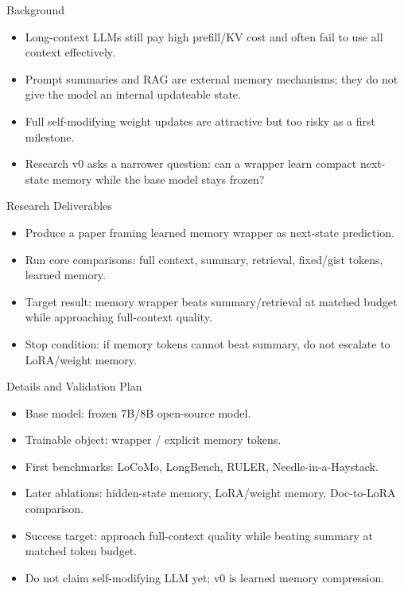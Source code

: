\begin{frame}{Background}
  \begin{itemize}
    \item Long-context LLMs still pay high prefill/KV cost and often fail to use all context effectively.
    \item Prompt summaries and RAG are external memory mechanisms; they do not give the model an internal updateable state.
    \item Full self-modifying weight updates are attractive but too risky as a first milestone.
    \item Research v0 asks a narrower question: can a wrapper learn compact next-state memory while the base model stays frozen?
  \end{itemize}
\end{frame}

\begin{frame}{Research Deliverables}
  \begin{itemize}
    \item Produce a paper framing learned memory wrapper as next-state prediction.
    \item Run core comparisons: full context, summary, retrieval, fixed/gist tokens, learned memory.
    \item Target result: memory wrapper beats summary/retrieval at matched budget while approaching full-context quality.
    \item Stop condition: if memory tokens cannot beat summary, do not escalate to LoRA/weight memory.
  \end{itemize}
\end{frame}

\begin{frame}{Details and Validation Plan}
  \begin{itemize}
    \item Base model: frozen 7B/8B open-source model.
    \item Trainable object: wrapper / explicit memory tokens.
    \item First benchmarks: LoCoMo, LongBench, RULER, Needle-in-a-Haystack.
    \item Later ablations: hidden-state memory, LoRA/weight memory, Doc-to-LoRA comparison.
    \item Success target: approach full-context quality while beating summary at matched token budget.
    \item Do not claim self-modifying LLM yet; v0 is learned memory compression.
  \end{itemize}
\end{frame}
